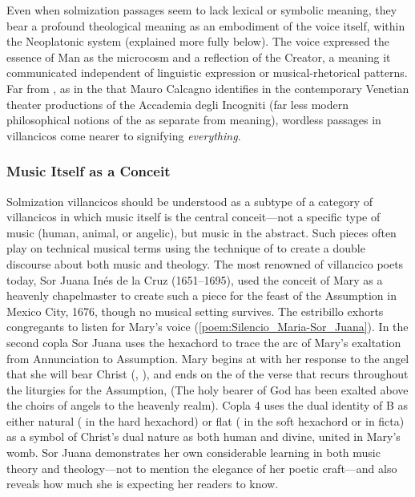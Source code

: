 Even when solmization passages seem to lack lexical or symbolic meaning, they
bear a profound theological meaning as an embodiment of the voice itself,
within the Neoplatonic system (explained more fully below).
The voice expressed the essence of Man as the microcosm and a reflection of the
Creator, a meaning it communicated independent of linguistic expression or
musical-rhetorical patterns.
Far from , as in the  that Mauro Calcagno identifies in the contemporary Venetian theater
productions of the Accademia degli Incogniti (far less modern philosophical
notions of the  as separate from meaning), wordless
passages in villancicos come nearer to signifying \emph{everything}.%
    \Autocites
    {Calcagno:SignifyingNothing}
    {Feldman:Voice}
    {Barthes:GrainOfVoice}
    {Dolar:Voice}
    {Cavarero:Voice}

\subsubsection{Music Itself as a Conceit}

Solmization villancicos should be understood as a subtype of a category of
villancicos in which music itself is the central conceit---not a specific type
of music (human, animal, or angelic), but music in the abstract.
Such pieces often play on technical musical terms using the technique of
 to create a double discourse about both music and theology.
The most renowned of villancico poets today, Sor Juana Inés de la Cruz
(1651--1695), used the conceit of Mary as a heavenly chapelmaster to create
such a piece for the feast of the Assumption in Mexico City, 1676, though no
musical setting survives.%
    \Autocite[, ]{SorJuana:VC} 
The estribillo exhorts congregants to listen for Mary's voice
(\cref{poem:Silencio_Maria-Sor_Juana}).
In the second copla Sor Juana uses the hexachord to trace the arc of Mary's
exaltation from Annunciation to Assumption. 
Mary begins at  with her response to the angel that she will bear
Christ (, ), and ends on the
 of the verse that recurs throughout the liturgies for the Assumption,
 (The holy bearer of God has been exalted above the choirs of angels to
the heavenly realm).
Copla 4 uses the dual identity of B as either natural ( in the hard
hexachord) or flat ( in the soft hexachord or in ficta) as a symbol of
Christ's dual nature as both human and divine, united in Mary's womb.
Sor Juana demonstrates her own considerable learning in both music theory and
theology---not to mention the elegance of her poetic craft---and also reveals
how much she is expecting her readers to know.%
    \Autocites
    {Stevenson:SorJuanaMusicalRapports}
    {Tenorio:SorJuana}


